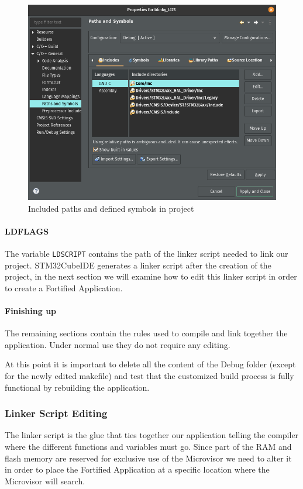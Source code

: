 \documentclass{article}
\begin{document}
\begin{figure}
\centering
\includegraphics[scale=.4]{images/def_inc.png}
\caption{Included paths and defined symbols in project}
\label{fig:def_inc}
\end{figure}

\paragraph{LDFLAGS} The variable \verb|LDSCRIPT| contains the path of the linker script needed to link our project. STM32CubeIDE generates a linker script after the creation of the project, in the next section we will examine how to edit this linker script in order to create a Fortified Application.

\paragraph{Finishing up}
The remaining sections contain the rules used to compile and link together the application. Under normal use they do not require any editing.

At this point it is important to delete all the content of the Debug folder (except for the newly edited makefile) and test that the customized build process is fully functional by rebuilding the application.

\subsubsection{Linker Script Editing}
The linker script is the glue that ties together our application telling the compiler where the different functions and variables must go.
Since part of the RAM and flash memory are reserved for exclusive use of the Microvisor we need to alter it in order to place the Fortified Application at a specific location where the Microvisor will search.
\end{document}
